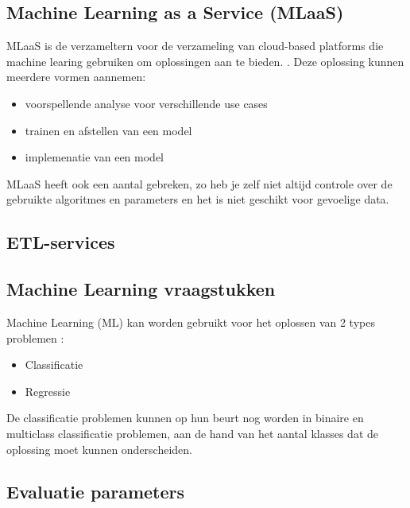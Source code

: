 \subsection{Machine Learning as a Service (MLaaS)}
MLaaS is de verzameltern voor de verzameling van cloud-based platforms die machine learing gebruiken om oplossingen aan te bieden. \autocite{Onose2022}. Deze oplossing kunnen meerdere vormen aannemen: 
\begin{itemize}
    \item voorspellende analyse voor verschillende use cases
    \item trainen en afstellen van een model
    \item implemenatie van een model
\end{itemize}

MLaaS heeft ook een aantal gebreken, zo heb je zelf niet altijd controle over de gebruikte algoritmes en parameters en het is niet geschikt voor gevoelige data.

\subsection{ETL-services}

\subsection{Machine Learning vraagstukken}
Machine Learning (ML) kan worden gebruikt voor het oplossen van 2 types problemen : 
\begin{itemize}
    \item Classificatie
    \item Regressie
\end{itemize}  

De classificatie problemen kunnen op hun beurt nog worden in binaire en multiclass classificatie problemen, aan de hand van het aantal klasses dat de oplossing moet kunnen onderscheiden.  \autocite{Olugbenga2022}
\subsection{Evaluatie parameters}
